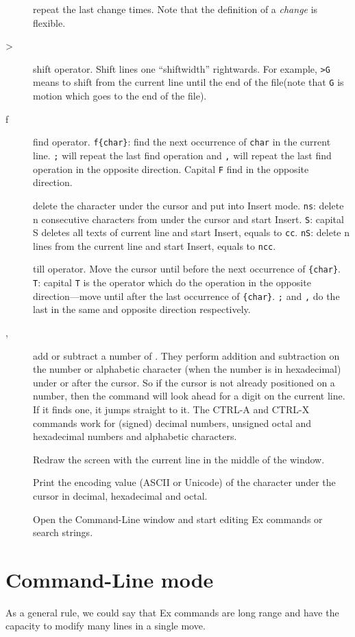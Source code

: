 \begin{description}
\item[] repeat the last change \syntax{[count]} times. Note that the definition of a \emph{change} is flexible.
\item[>] shift operator. Shift lines one ``shiftwidth'' rightwards. For example, \verb|>G| means to shift from the current line until the end of the file(note that \texttt{G} is motion which goes to the end of the file).
\item[f] find operator. \verb|f{char}|: find the next occurrence of \texttt{char} in the current line. \verb|;| will repeat the last find operation and \verb|,| will repeat the last find operation in the opposite direction. Capital \texttt{F} find in the opposite direction. 
\item[] delete the character under the cursor and put into Insert mode. \texttt{ns}: delete n consecutive characters from under the cursor and start Insert. \texttt{S}: capital S deletes all texts of current line and start Insert, equals to \verb|cc|. \texttt{nS}: delete n lines from the current line and start Insert, equals to \verb|ncc|.
\item[] till operator. Move the cursor until before the next occurrence of \verb|{char}|. \texttt{T}: capital \verb|T| is the operator which do the operation in the opposite direction---move until after the last occurrence of \verb|{char}|. \verb|;| and \verb|,| do the last  in the same and opposite direction respectively.
\item[, ] add or subtract a number of \syntax{[count]}. They perform addition and subtraction on the number or alphabetic character (when the number is in hexadecimal) under or after the cursor. So if the cursor is not already positioned on a number, then the command will look ahead for a digit on the current line. If it finds one, it jumps straight to it. The CTRL-A and CTRL-X commands work for (signed) decimal numbers, unsigned octal and hexadecimal numbers and alphabetic characters.
\item[] Redraw the screen with the current line in the middle of the window.
\item[] Print the encoding value (ASCII or Unicode) of the character under the cursor in decimal, hexadecimal and octal.
\item[] Open the Command-Line window and start editing Ex commands or search strings.
\end{description}
\part{Command-Line mode}
As a general rule, we could say that Ex commands are long range and have the capacity to modify many lines in a single move.



